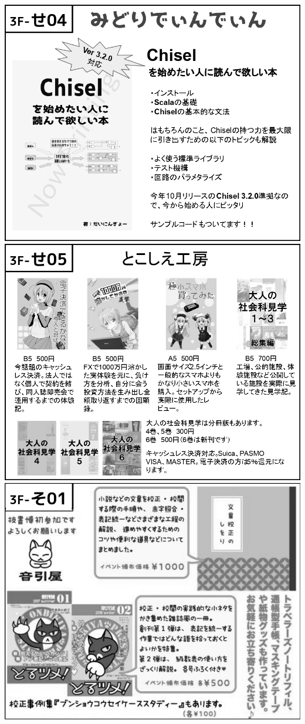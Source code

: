 \begin{center}
\includegraphics[width=0.9\linewidth]{images/circle-appeals/3F-せ04.jpg}
\includegraphics[width=0.9\linewidth]{images/circle-appeals/3F-せ05.jpg}
\includegraphics[width=0.9\linewidth]{images/circle-appeals/3F-そ01.jpg}

\end{center}
